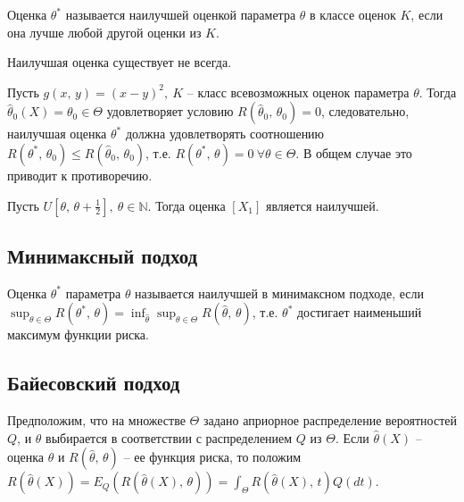 \begin{definition}
    Оценка $\displaystyle \theta ^{*}$ называется наилучшей оценкой параметра $\displaystyle \theta $ в классе оценок $\displaystyle K$, если она лучше любой другой оценки из $\displaystyle K$.
\end{definition}

\begin{note}
    Наилучшая оценка существует не всегда.
\end{note}

\begin{example}
    Пусть $\displaystyle g(x,\, y) =( x-y)^{2},\ K$ -- класс всевозможных оценок параметра $\displaystyle \theta $. Тогда $\displaystyle \hat{\theta }_{0}( X) =\theta _{0} \in \Theta $ удовлетворяет условию $\displaystyle R(\hat{\theta }_{0},\, \theta _{0}) =0$, следовательно, наилучшая оценка $\displaystyle \theta ^{*}$ должна удовлетворять соотношению $\displaystyle R\left( \theta ^{*},\, \theta _{0}\right) \leqslant R(\hat{\theta }_{0},\, \theta _{0})$, т.е. $\displaystyle R\left( \theta ^{*},\, \theta \right) =0\ \forall \theta \in \Theta $. В общем случае это приводит к противоречию.
\end{example}

\begin{example}
    Пусть $\displaystyle U\left[ \theta,\, \theta +\frac{1}{2}\right],\ \theta \in \mathbb{N}$. Тогда оценка $\displaystyle [ X_{1}]$ является наилучшей.
\end{example}

\subsection*{Минимаксный подход}

\begin{definition}
    Оценка $\displaystyle \theta ^{*}$ параметра $\displaystyle \theta $ называется наилучшей в минимаксном подходе, если $\displaystyle \sup _{\theta \in \Theta } R\left( \theta ^{*} ,\, \theta \right) =\inf_{\hat{\theta }}\sup _{\theta \in \Theta } R(\hat{\theta } ,\, \theta )$, т.е. $\displaystyle \theta ^{*}$ достигает наименьший максимум функции риска.
\end{definition}

\subsection*{Байесовский подход}

Предположим, что на множестве $\displaystyle \Theta $ задано априорное распределение вероятностей $\displaystyle Q$, и $\displaystyle \theta $ выбирается в соответствии с распределением $\displaystyle Q$ из $\displaystyle \Theta $. Если $\displaystyle \hat{\theta }( X)$ -- оценка $\displaystyle \theta $ и $\displaystyle R(\hat{\theta },\, \theta )$ -- ее функция риска, то положим $\displaystyle R(\hat{\theta }( X)) =E_{Q}(R(\hat{\theta }( X),\, \theta )) =\int _{\Theta } R(\hat{\theta }( X),\, t) Q( dt)$.


